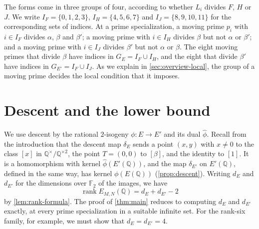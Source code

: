 \documentclass[12pt,oneside,openany]{book}
\theoremstyle{definition}
\theoremstyle{plain}
\numberwithin{equation}{chapter}
\theoremstyle{plain}
\theoremstyle{definition}
\theoremstyle{remark}
\newcommand{\Q}{\mathbb Q}
\newcommand{\F}{\mathbb F}
\DeclareMathOperator{\rk}{rank}
\newcommand{\sq}[1]{[#1]}
\newcommand{\sqgp}[1]{#1^{\times}/#1^{\times2}}
\newcommand{\dual}{\hat\phi}
\begin{document}
The forms come in three groups of four, according to whether $L_i$ divides $F$, $H$ or $J$. We write $I_F=\{0,1,2,3\}$, $I_H=\{4,5,6,7\}$ and $I_J=\{8,9,10,11\}$ for the corresponding sets of indices. At a prime specialization, a moving prime $p_i$ with $i\in I_F$ divides $\alpha$, $\beta$ and $\beta'$; a moving prime with $i\in I_H$ divides $\beta$ but not $\alpha$ or $\beta'$; and a moving prime with $i\in I_J$ divides $\beta'$ but not $\alpha$ or $\beta$. The eight moving primes that divide $\beta$ have indices in $G_E=I_F\cup I_H$, and the eight that divide $\beta'$ have indices in $G_{E'}=I_F\cup I_J$. As we explain in \cref{sec:overview-local}, the group of a moving prime decides the local condition that it imposes.

\section{Descent and the lower bound}\label{sec:overview-descent}

We use descent by the rational $2$-isogeny $\phi\colon E\to E'$ and its dual $\dual$. Recall from the introduction that the descent map $\delta_E$ sends a point $(x,y)$ with $x\ne0$ to the class $\sq x$ in $\sqgp\Q$, the point $T=(0,0)$ to $\sq\beta$, and the identity to $\sq1$. It is a homomorphism with kernel $\dual(E'(\Q))$, and the map $\delta_{E'}$ on $E'(\Q)$, defined in the same way, has kernel $\phi(E(\Q))$ (\cref{prop:descent}). Writing $d_E$ and $d_{E'}$ for the dimensions over $\F_2$ of the images, we have
\begin{equation*}
\rk E_{M,N}(\Q)=d_E+d_{E'}-2
\end{equation*}
by \cref{lem:rank-formula}. The proof of \cref{thm:main} reduces to computing $d_E$ and $d_{E'}$ exactly, at every prime specialization in a suitable infinite set. For the rank-six family, for example, we must show that $d_E=d_{E'}=4$.
\end{document}
